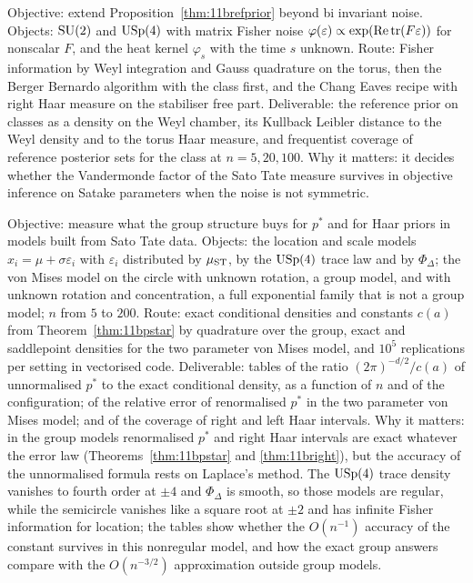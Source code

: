 \begin{compproblem}\label{cp:11bchangeaves}
Objective: extend Proposition~\ref{thm:11brefprior} beyond bi invariant noise. Objects: $\mathrm{SU}(2)$ and $\mathrm{USp}(4)$ with matrix Fisher noise $\varphi(\varepsilon)\propto\exp(\operatorname{Re}\operatorname{tr}(F\varepsilon))$ for nonscalar $F$, and the heat kernel $\varphi_s$ with the time $s$ unknown. Route: Fisher information by Weyl integration and Gauss quadrature on the torus, then the Berger Bernardo algorithm with the class first, and the Chang Eaves recipe with right Haar measure on the stabiliser free part. Deliverable: the reference prior on classes as a density on the Weyl chamber, its Kullback Leibler distance to the Weyl density and to the torus Haar measure, and frequentist coverage of reference posterior sets for the class at $n=5,20,100$. Why it matters: it decides whether the Vandermonde factor of the Sato Tate measure survives in objective inference on Satake parameters when the noise is not symmetric.
\end{compproblem}

\begin{compproblem}\label{cp:11bpstar}
Objective: measure what the group structure buys for $p^*$ and for Haar priors in models built from Sato Tate data. Objects: the location and scale models $x_i=\mu+\sigma\varepsilon_i$ with $\varepsilon_i$ distributed by $\mu_{\mathrm{ST}}$, by the $\mathrm{USp}(4)$ trace law and by $\Phi_\Delta$; the von Mises model on the circle with unknown rotation, a group model, and with unknown rotation and concentration, a full exponential family that is not a group model; $n$ from $5$ to $200$. Route: exact conditional densities and constants $c(a)$ from Theorem~\ref{thm:11bpstar} by quadrature over the group, exact and saddlepoint densities for the two parameter von Mises model, and $10^5$ replications per setting in vectorised code. Deliverable: tables of the ratio $(2\pi)^{-d/2}/c(a)$ of unnormalised $p^*$ to the exact conditional density, as a function of $n$ and of the configuration; of the relative error of renormalised $p^*$ in the two parameter von Mises model; and of the coverage of right and left Haar intervals. Why it matters: in the group models renormalised $p^*$ and right Haar intervals are exact whatever the error law (Theorems~\ref{thm:11bpstar} and \ref{thm:11bright}), but the accuracy of the unnormalised formula rests on Laplace's method. The $\mathrm{USp}(4)$ trace density vanishes to fourth order at $\pm4$ and $\Phi_\Delta$ is smooth, so those models are regular, while the semicircle vanishes like a square root at $\pm2$ and has infinite Fisher information for location; the tables show whether the $O(n^{-1})$ accuracy of the constant survives in this nonregular model, and how the exact group answers compare with the $O(n^{-3/2})$ approximation outside group models.
\end{compproblem}

